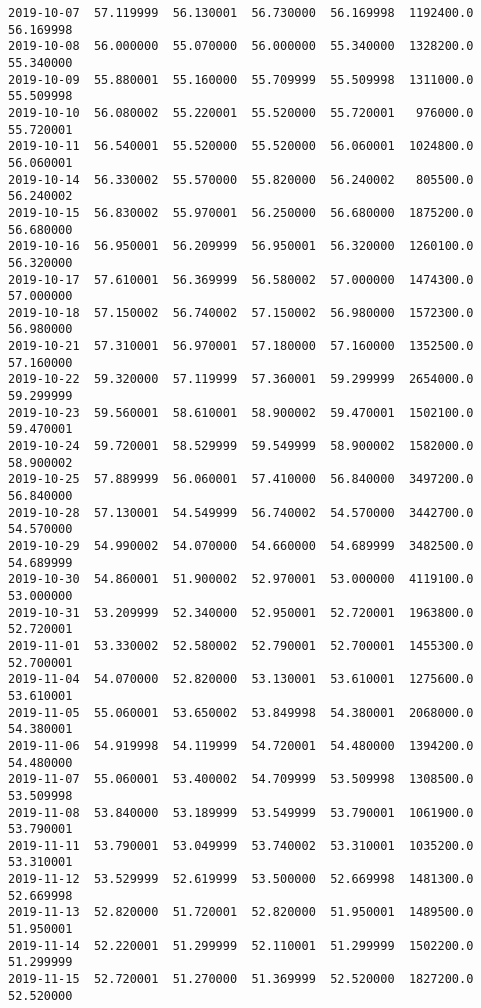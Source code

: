 \documentclass[11pt]{article}
\begin{document}
\begin{Verbatim}[commandchars=\\\{\}]
2019-10-07  57.119999  56.130001  56.730000  56.169998  1192400.0  56.169998
2019-10-08  56.000000  55.070000  56.000000  55.340000  1328200.0  55.340000
2019-10-09  55.880001  55.160000  55.709999  55.509998  1311000.0  55.509998
2019-10-10  56.080002  55.220001  55.520000  55.720001   976000.0  55.720001
2019-10-11  56.540001  55.520000  55.520000  56.060001  1024800.0  56.060001
2019-10-14  56.330002  55.570000  55.820000  56.240002   805500.0  56.240002
2019-10-15  56.830002  55.970001  56.250000  56.680000  1875200.0  56.680000
2019-10-16  56.950001  56.209999  56.950001  56.320000  1260100.0  56.320000
2019-10-17  57.610001  56.369999  56.580002  57.000000  1474300.0  57.000000
2019-10-18  57.150002  56.740002  57.150002  56.980000  1572300.0  56.980000
2019-10-21  57.310001  56.970001  57.180000  57.160000  1352500.0  57.160000
2019-10-22  59.320000  57.119999  57.360001  59.299999  2654000.0  59.299999
2019-10-23  59.560001  58.610001  58.900002  59.470001  1502100.0  59.470001
2019-10-24  59.720001  58.529999  59.549999  58.900002  1582000.0  58.900002
2019-10-25  57.889999  56.060001  57.410000  56.840000  3497200.0  56.840000
2019-10-28  57.130001  54.549999  56.740002  54.570000  3442700.0  54.570000
2019-10-29  54.990002  54.070000  54.660000  54.689999  3482500.0  54.689999
2019-10-30  54.860001  51.900002  52.970001  53.000000  4119100.0  53.000000
2019-10-31  53.209999  52.340000  52.950001  52.720001  1963800.0  52.720001
2019-11-01  53.330002  52.580002  52.790001  52.700001  1455300.0  52.700001
2019-11-04  54.070000  52.820000  53.130001  53.610001  1275600.0  53.610001
2019-11-05  55.060001  53.650002  53.849998  54.380001  2068000.0  54.380001
2019-11-06  54.919998  54.119999  54.720001  54.480000  1394200.0  54.480000
2019-11-07  55.060001  53.400002  54.709999  53.509998  1308500.0  53.509998
2019-11-08  53.840000  53.189999  53.549999  53.790001  1061900.0  53.790001
2019-11-11  53.790001  53.049999  53.740002  53.310001  1035200.0  53.310001
2019-11-12  53.529999  52.619999  53.500000  52.669998  1481300.0  52.669998
2019-11-13  52.820000  51.720001  52.820000  51.950001  1489500.0  51.950001
2019-11-14  52.220001  51.299999  52.110001  51.299999  1502200.0  51.299999
2019-11-15  52.720001  51.270000  51.369999  52.520000  1827200.0  52.520000


\end{Verbatim}
\end{document}
